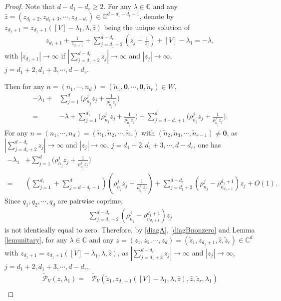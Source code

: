 \documentclass[12pt,letterpaper]{amsart}
\newcommand{\abs}[1]{\left\lvert #1 \right\rvert}
\def\C{{\mathbb C}}
\begin{document}
\begin{proof}
Note that $d-d_1-d_r\geq 2$.  For any $\lambda\in\C$ and any $\hat{z}=(z_{d_1+2},z_{d_1+3},\cdots,z_{d-d_r})\in\C^{d-d_1-d_r-1}$, denote by $z_{d_1+1}=z_{d_1+1}([V]-\lambda_1,\lambda,\hat{z})$ being the unique solution of
\begin{align}
z_{d_1+1}+\frac{1}{z_{d_1+1}}+\sum_{j=d_1+2}^{d-d_r}\left(z_j+\frac{1}{z_j}\right)+[V]-\lambda_1=-\lambda,\label{zd1lambda}
\end{align}
with $\abs{z_{d_1+1}}\to\infty$ if
$\abs{\sum_{j=d_1+2}^{d-d_r}z_j}\to\infty$
and $\abs{z_j}\to\infty$, $j=d_1+2,d_1+3,\cdots,d-d_r$.

Then for any $n=(n_1,\cdots,n_d)=(\tilde{n}_1,\mathbf{0},\cdots,\mathbf{0},\tilde{n}_r)\in W$,
\begin{align}
[V]-\lambda_1+&\sum_{j=1}^d\Big(\rho^j_{n_j}z_j+\frac{1}{\rho^j_{n_j}z_j}\Big)\nonumber\\
=&-\lambda+\sum_{j=1}^{d_1}\Big(\rho^j_{n_j}z_j+\frac{1}{\rho^j_{n_j}z_j}\Big)+\sum_{j=d-d_r+1}^{d}
\Big(\rho^j_{n_j}z_j+\frac{1}{\rho^j_{n_j}z_j}\Big).\label{diagA}
\end{align}
For any $n=(n_1,\cdots,n_d)=(\tilde{n}_1,\tilde{n}_2,\cdots,\tilde{n}_r)$ with $(\tilde{n}_2,\tilde{n}_3,\cdots,\tilde{n}_{r-1})\neq \mathbf{0}$, as $\abs{\sum_{j=d_1+2}^{d-d_r}z_j}\to\infty$
and $\abs{z_j}\to\infty$, $j=d_1+2,d_1+3,\cdots,d-d_r$, one has
\begin{align}
[V]-\lambda_1&+\sum_{j=1}^d\Big(\rho^j_{n_j}z_j+\frac{1}{\rho^j_{n_j}z_j}\Big)\nonumber\\
=&\left(\sum_{j=1}^{d_1}+\sum_{j=d-d_r+1}^{d}\right)\left(\rho^j_{n_j}z_j+\frac{1}{\rho^j_{n_j}z_j}\right)+\sum_{j={d_1+2}}^{d-d_r}\left(\rho^j_{n_j}-\rho^{d_1+1}_{n_{d_1+1}}\right)z_j+O(1).\label{diagBnonzero}
\end{align}
Since $q_1,q_2,\cdots,q_d$ are pairwise coprime,
\begin{align}
\sum_{j={d_1+2}}^{d-d_r}\left(\rho^j_{n_j}-\rho^{d_1+1}_{n_{d_1+1}}\right)z_j\nonumber
\end{align}
is not identically equal to zero.
Therefore, by \eqref{diagA}, \eqref{diagBnonzero} and Lemma \ref{lemunitary}, for any $\lambda\in\C$ and any $z=(z_1,z_2,\cdots,z_d)=(\tilde{z}_1,z_{d_1+1},\hat{z},\tilde{z}_r)\in\C^d$ with $z_{d_1+1}=z_{d_1+1}([V]-\lambda_1,\lambda,\hat{z})$,
as $\abs{\sum_{j=d_1+2}^{d-d_r}z_j}\to\infty$
and $\abs{z_j}\to\infty$, $j=d_1+2,d_1+3,\cdots,d-d_r$,
\begin{align}
\tilde{\mathcal{P}}_V(z,\lambda_1)=&\tilde{\mathcal{P}}_V(\tilde{z}_1,z_{d_1+1}([V]-\lambda_1,\lambda,\hat{z}),\hat{z},\tilde{z}_r,\lambda_1)\label{pvz1fer}\\

\end{align}
\end{proof}
\end{document}
